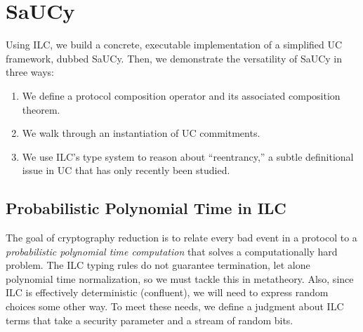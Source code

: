 \section{SaUCy}
\label{sec:saucy}

Using ILC, we build a concrete, executable implementation of a simplified UC
framework, dubbed SaUCy. Then, we demonstrate the versatility of SaUCy in three
ways:
\begin{enumerate}[leftmargin=*]
\item We define a protocol composition operator and its associated composition theorem.
\item We walk through an instantiation of UC commitments.
\item We use ILC's type system to reason about ``reentrancy,'' a subtle definitional issue in UC that has only recently been studied.
\end{enumerate}




\subsection{Probabilistic Polynomial Time in ILC}
\label{subsec:ppt}
The goal of cryptography reduction is to relate every bad event in a protocol to
a \emph{probabilistic polynomial time computation} that solves a computationally
hard problem.  The ILC typing rules do not guarantee termination, let alone
polynomial time normalization, so we must tackle this in metatheory.  Also,
since ILC is effectively deterministic (confluent), we will need to express
random choices some other way.  To meet these needs, we define a judgment about
ILC terms that take a security parameter and a stream of random bits.

